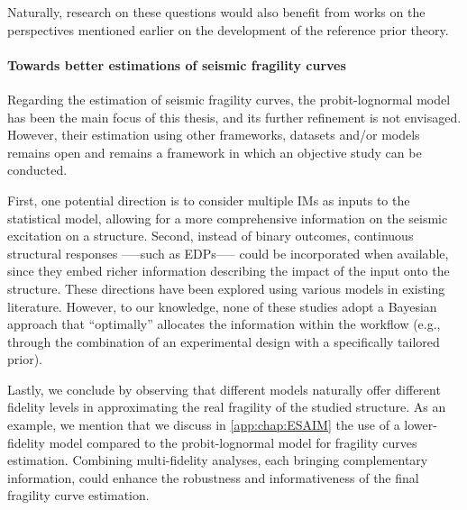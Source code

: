 Naturally, research on these questions would also benefit from works on the perspectives mentioned earlier
on the development of the reference prior theory.



\paragraph{Towards better estimations of seismic fragility curves}


Regarding the estimation of seismic fragility curves, the probit-lognormal model has been the main focus of this thesis,
and its further refinement is not envisaged.
However, their estimation using
other frameworks, datasets and/or models remains open and remains a framework in which an objective study can be conducted.

First, one potential direction is to consider multiple IMs as inputs to the statistical model, allowing for a more comprehensive information on the seismic excitation on a structure. Second, instead of binary outcomes, continuous structural responses --—such as EDPs—-- could be incorporated when available, since they embed richer information describing the impact of the input onto the structure. These directions have been explored using various models in existing literature. However, to our knowledge, none of these studies adopt a Bayesian approach that ``optimally'' allocates the information within the workflow (e.g., through the combination of an experimental design with a specifically tailored prior).

Lastly, we conclude by observing that different models naturally offer different fidelity levels in approximating the real fragility of the studied structure. As an example, we mention that we discuss in \cref{app:chap:ESAIM} the use of 
a lower-fidelity model compared to the probit-lognormal model for fragility curves estimation. Combining multi-fidelity analyses, each bringing complementary information, could enhance the robustness and informativeness of the final fragility curve estimation.









